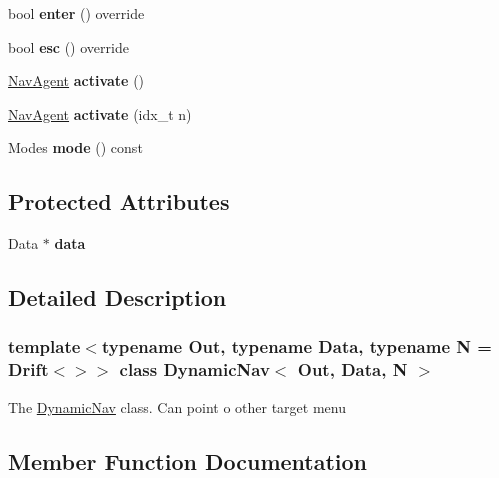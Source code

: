 \begin{DoxyCompactItemize}
\mbox{\label{classDynamicNav_a1781e521f7d4e267f5e401c6070667b6}} 
bool {\bfseries enter} () override
\item 
\mbox{\label{classDynamicNav_abfa730037c5dd6f8902d5f76bba9121b}} 
bool {\bfseries esc} () override
\item 
\mbox{\label{classDynamicNav_a4c4a040f3705bf54d65514a3003733c8}} 
\hyperlink{structNavAgent}{Nav\+Agent} {\bfseries activate} ()
\item 
\mbox{\label{classDynamicNav_aac04efedd7e923981ac964878aff069f}} 
\hyperlink{structNavAgent}{Nav\+Agent} {\bfseries activate} (idx\+\_\+t n)
\item 
\mbox{\label{classDynamicNav_a9bd7bdc2c18c33656b37a607e9f89717}} 
Modes {\bfseries mode} () const
\end{DoxyCompactItemize}
\subsection*{Protected Attributes}
\begin{DoxyCompactItemize}
\item 
\mbox{\label{classDynamicNav_ae8525b309283d508cd2e36f78bd113f2}} 
Data $\ast$ {\bfseries data}
\end{DoxyCompactItemize}


\subsection{Detailed Description}
\subsubsection*{template$<$typename Out, typename Data, typename N = Drift$<$$>$$>$\newline
class Dynamic\+Nav$<$ Out, Data, N $>$}

The \hyperlink{classDynamicNav}{Dynamic\+Nav} class. Can point o other target menu 

\subsection{Member Function Documentation}
\mbox{\label{classDynamicNav_a13aab7546c1a57cd7d999b22be2f2364}} 
